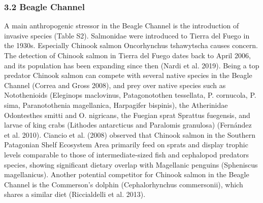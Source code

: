 \documentclass[
]{article}
\begin{document}
\subsubsection{3.2 Beagle Channel}\label{beagle-channel}

A main anthropogenic stressor in the Beagle Channel is the introduction
of invasive species (Table S2). Salmonidae were introduced to Tierra del
Fuego in the 1930s. Especially Chinook salmon Oncorhynchus tshawytscha
causes concern. The detection of Chinook salmon in Tierra del Fuego
dates back to April 2006, and its population has been expanding since
then (Nardi et al. 2019). Being a top predator Chinook salmon can
compete with several native species in the Beagle Channel (Correa and
Gross 2008), and prey over native species such as Notothenioids
(Eleginops maclovinus, Patagonotothen tessellata, P. cornucola, P. sima,
Paranotothenia magellanica, Harpagifer bispinis), the Atherinidae
Odontesthes smitti and O. nigricans, the Fuegian sprat Sprattus
fuegensis, and larvae of king crabs (Lithodes antarcticus and Paralomis
granulosa) (Fernández et al. 2010). Ciancio et al. (2008) observed that
Chinook salmon in the Southern Patagonian Shelf Ecosystem Area primarily
feed on sprats and display trophic levels comparable to those of
intermediate-sized fish and cephalopod predators species, showing
significant dietary overlap with Magellanic penguins (Spheniscus
magellanicus). Another potential competitor for Chinook salmon in the
Beagle Channel is the Commerson's dolphin (Cephalorhynchus commersonii),
which shares a similar diet (Riccialdelli et al. 2013).
\end{document}
